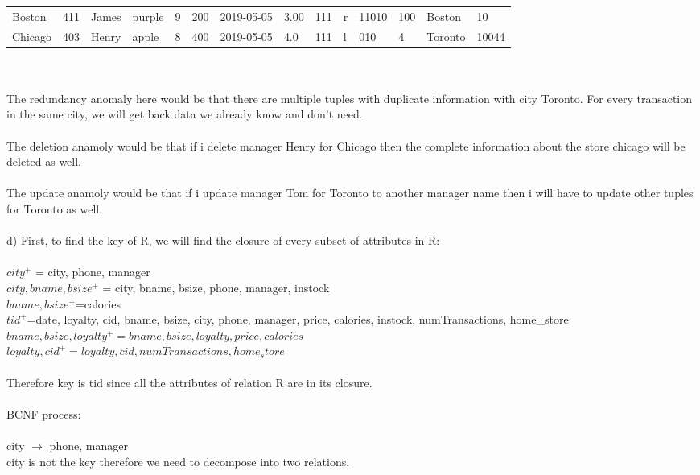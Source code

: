 \documentclass{article}
\begin{document}
\begin{enumerate}
\begin{table}[h]
\begin{adjustbox}{width=1.1\textwidth}
\begin{tabular}{llllllllllllll}
			Boston  & 411 & James & purple & 9  & 200 & 2019-05-05 & 3.00 & 111  & r & 11010 & 100  & Boston  & 10   \\
			Chicago & 403 & Henry & apple & 8 & 400 & 2019-05-05 & 4.0 & 111 & l  & 010 &4 & Toronto & 10044\\
		\end{tabular}
		\end{adjustbox}
		\end{table}
		\\\\
		The redundancy anomaly here would be that there are multiple tuples with duplicate information with city Toronto. For every transaction in the same city, we will get back data we already know and don't need.\\\\
		The deletion anamoly would be that if i delete manager Henry for Chicago then the complete information about the store chicago will be deleted as well.\\\\
		The update anamoly would be that if i update manager Tom for Toronto to another manager name then i will have to update other tuples for Toronto as well.
		\\\\
	d) First, to find the key of R, we will find the closure of every subset of attributes in R:\\\\
	$city^{+}$ = city, phone, manager\\
	  $city,bname,bsize^{+}$ = city, bname, bsize, phone, manager, instock\\
	  $bname,bsize^{+}$=calories\\
	  $tid^{+}$=date, loyalty, cid, bname, bsize, city, phone, manager, price, calories, instock, numTransactions, home\_store\\
	  $bname,bsize,loyalty^{+}=bname,bsize,loyalty,price,calories$\\
	  $loyalty,cid^{+}=loyalty,cid,numTransactions,home_store$\\\\
	  Therefore key is tid since all the attributes of relation R are in its closure.\\\\
	  BCNF process:\\\\
	  city $\rightarrow$ phone, manager\\
	  city is not the key therefore we need to decompose into two relations.\\

\end{enumerate}
\end{document}
